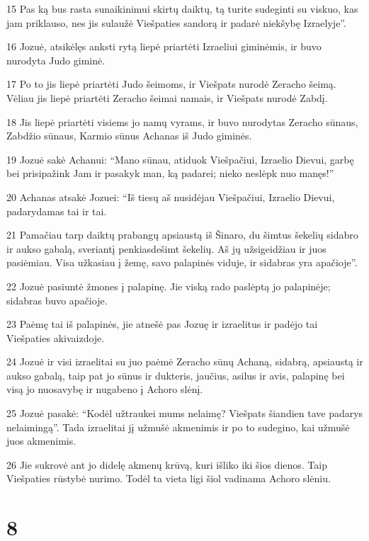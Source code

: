 \par 15 Pas ką bus rasta sunaikinimui skirtų daiktų, tą turite sudeginti su viskuo, kas jam priklauso, nes jis sulaužė Viešpaties sandorą ir padarė niekšybę Izraelyje”. 
\par 16 Jozuė, atsikėlęs anksti rytą liepė priartėti Izraeliui giminėmis, ir buvo nurodyta Judo giminė. 
\par 17 Po to jis liepė priartėti Judo šeimoms, ir Viešpats nurodė Zeracho šeimą. Vėliau jis liepė priartėti Zeracho šeimai namais, ir Viešpats nurodė Zabdį. 
\par 18 Jis liepė priartėti visiems jo namų vyrams, ir buvo nurodytas Zeracho sūnaus, Zabdžio sūnaus, Karmio sūnus Achanas iš Judo giminės. 
\par 19 Jozuė sakė Achanui: “Mano sūnau, atiduok Viešpačiui, Izraelio Dievui, garbę bei prisipažink Jam ir pasakyk man, ką padarei; nieko neslėpk nuo manęs!” 
\par 20 Achanas atsakė Jozuei: “Iš tiesų aš nusidėjau Viešpačiui, Izraelio Dievui, padarydamas tai ir tai. 
\par 21 Pamačiau tarp daiktų prabangų apsiaustą iš Šinaro, du šimtus šekelių sidabro ir aukso gabalą, sveriantį penkiasdešimt šekelių. Aš jų užsigeidžiau ir juos pasiėmiau. Visa užkasiau į žemę, savo palapinės viduje, ir sidabras yra apačioje”. 
\par 22 Jozuė pasiuntė žmones į palapinę. Jie viską rado paslėptą jo palapinėje; sidabras buvo apačioje. 
\par 23 Paėmę tai iš palapinės, jie atnešė pas Jozuę ir izraelitus ir padėjo tai Viešpaties akivaizdoje. 
\par 24 Jozuė ir visi izraelitai su juo paėmė Zeracho sūnų Achaną, sidabrą, apsiaustą ir aukso gabalą, taip pat jo sūnus ir dukteris, jaučius, asilus ir avis, palapinę bei visą jo nuosavybę ir nugabeno į Achoro slėnį. 
\par 25 Jozuė pasakė: “Kodėl užtraukei mums nelaimę? Viešpats šiandien tave padarys nelaimingą”. Tada izraelitai jį užmušė akmenimis ir po to sudegino, kai užmušė juos akmenimis. 
\par 26 Jie sukrovė ant jo didelę akmenų krūvą, kuri išliko iki šios dienos. Taip Viešpaties rūstybė nurimo. Todėl ta vieta ligi šiol vadinama Achoro slėniu.



\chapter{8}

